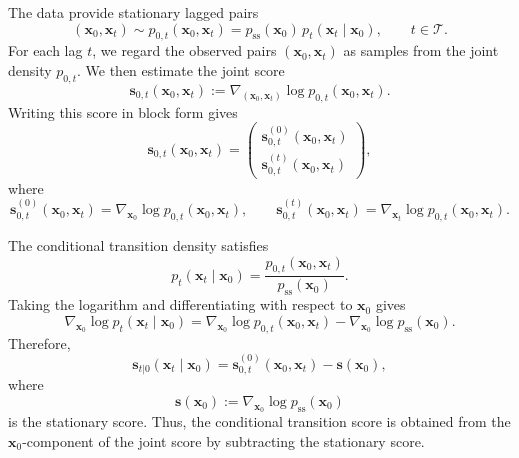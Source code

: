\documentclass[11pt,twoside,fleqn]{article}
\begin{document}
The data provide stationary lagged pairs
\begin{equation}
    (\bm{x}_0,\bm{x}_t)
    \sim
    p_{0,t}(\bm{x}_0,\bm{x}_t)
    =
    p_{\mathrm{ss}}(\bm{x}_0)\,
    p_t(\bm{x}_t\mid\bm{x}_0),
    \qquad
    t\in\mathcal{T}.
    \label{eq:app_lagged_pair_distribution}
\end{equation}
For each lag $t$, we regard the observed pairs $(\bm{x}_0,\bm{x}_t)$ as
samples from the joint density $p_{0,t}$. We then estimate the joint score
\begin{equation}
    \bm{s}_{0,t}(\bm{x}_0,\bm{x}_t)
    :=
    \nabla_{(\bm{x}_0,\bm{x}_t)}
    \log p_{0,t}(\bm{x}_0,\bm{x}_t).
    \label{eq:app_joint_score_def}
\end{equation}
Writing this score in block form gives
\begin{equation}
    \bm{s}_{0,t}(\bm{x}_0,\bm{x}_t)
    =
    \begin{pmatrix}
        \bm{s}_{0,t}^{(0)}(\bm{x}_0,\bm{x}_t) \\
        \bm{s}_{0,t}^{(t)}(\bm{x}_0,\bm{x}_t)
    \end{pmatrix},
    \label{eq:app_joint_score_blocks}
\end{equation}
where
\begin{equation}
    \bm{s}_{0,t}^{(0)}(\bm{x}_0,\bm{x}_t)
    =
    \nabla_{\bm{x}_0}
    \log p_{0,t}(\bm{x}_0,\bm{x}_t),
    \qquad
    \bm{s}_{0,t}^{(t)}(\bm{x}_0,\bm{x}_t)
    =
    \nabla_{\bm{x}_t}
    \log p_{0,t}(\bm{x}_0,\bm{x}_t).
    \label{eq:app_joint_score_components}
\end{equation}

The conditional transition density satisfies
\begin{equation}
    p_t(\bm{x}_t\mid\bm{x}_0)
    =
    \frac{
        p_{0,t}(\bm{x}_0,\bm{x}_t)
    }{
        p_{\mathrm{ss}}(\bm{x}_0)
    }.
    \label{eq:app_transition_density_from_joint}
\end{equation}
Taking the logarithm and differentiating with respect to $\bm{x}_0$ gives
\begin{equation}
    \nabla_{\bm{x}_0}\log p_t(\bm{x}_t\mid\bm{x}_0)
    =
    \nabla_{\bm{x}_0}
    \log p_{0,t}(\bm{x}_0,\bm{x}_t)
    -
    \nabla_{\bm{x}_0}
    \log p_{\mathrm{ss}}(\bm{x}_0).
    \label{eq:app_transition_score_from_joint}
\end{equation}
Therefore,
\begin{equation}
    \bm{s}_{t|0}(\bm{x}_t\mid\bm{x}_0)
    =
    \bm{s}_{0,t}^{(0)}(\bm{x}_0,\bm{x}_t)
    -
    \bm{s}(\bm{x}_0),
    \label{eq:app_conditional_score_joint_minus_stationary}
\end{equation}
where
\begin{equation}
    \bm{s}(\bm{x}_0)
    :=
    \nabla_{\bm{x}_0}\log p_{\mathrm{ss}}(\bm{x}_0)
    \label{eq:app_stationary_score_in_conditional_section}
\end{equation}
is the stationary score. Thus, the conditional transition score is obtained
from the $\bm{x}_0$-component of the joint score by subtracting the stationary
score.
\end{document}
